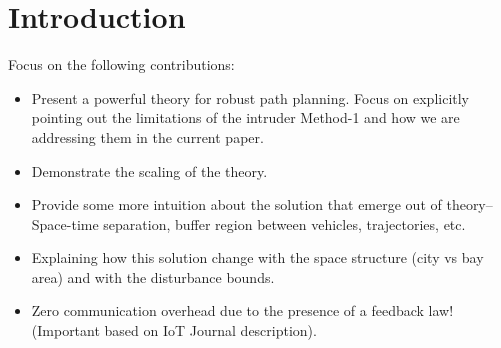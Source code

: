 \section{Introduction}

Focus on the following contributions:
\begin{itemize}
\item Present a powerful theory for robust path planning. Focus on explicitly pointing out the limitations of the intruder Method-1 and how we are addressing them in the current paper. 
\item Demonstrate the scaling of the theory.
\item Provide some more intuition about the solution that emerge out of theory-- Space-time separation, buffer region between vehicles, trajectories, etc.
\item Explaining how this solution change with the space structure (city vs bay area) and with the disturbance bounds.
\item Zero communication overhead due to the presence of a feedback law! (Important based on IoT Journal description).
\end{itemize}


